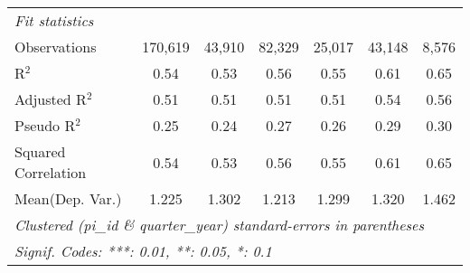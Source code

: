 \begin{tabular}{lcccccc}
   \midrule
   \emph{Fit statistics}\\
   Observations                                               & 170,619      & 43,910        & 82,329       & 25,017       & 43,148       & 8,576\\  
   R$^2$                                                      & 0.54         & 0.53          & 0.56         & 0.55         & 0.61         & 0.65\\  
   Adjusted R$^2$                                             & 0.51         & 0.51          & 0.51         & 0.51         & 0.54         & 0.56\\  
   Pseudo R$^2$                                               & 0.25         & 0.24          & 0.27         & 0.26         & 0.29         & 0.30\\  
   Squared Correlation                                        & 0.54         & 0.53          & 0.56         & 0.55         & 0.61         & 0.65\\  
Mean(Dep. Var.) & 1.225 & 1.302 & 1.213 & 1.299 & 1.320 & 1.462 \\
   \midrule \midrule
   \multicolumn{7}{l}{\emph{Clustered (pi\_id \& quarter\_year) standard-errors in parentheses}}\\
   \multicolumn{7}{l}{\emph{Signif. Codes: ***: 0.01, **: 0.05, *: 0.1}}\\
\end{tabular}
\par\endgroup
